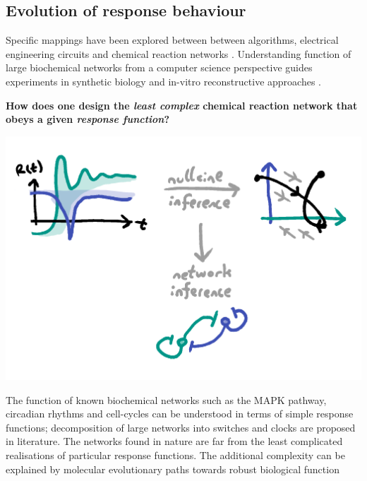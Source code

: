 \documentclass[a0,portrait]{a0poster}
\begin{document}
\color{DarkRed}\begin{center}
\section*{\huge Evolution of response behaviour}
\end{center}\color{Black}
\huge
Specific mappings have been explored between between algorithms, electrical
engineering circuits and chemical reaction networks \cite{Dalchau2014ComputationalNetworks}. Understanding function
of large biochemical networks from a computer science perspective guides experiments
in synthetic biology and in-vitro reconstructive approaches \cite{Loose2011MinMinE}.
\medbreak
\begin{tcolorbox}[boxrule=2pt,arc=3.4pt,boxsep=2mm]
\begin{center}\color{DarkRed}
\textbf{How does one design the \textit{least complex} chemical
reaction network that obeys a given \textit{response function}?}
\end{center}
\end{tcolorbox}
\begin{center}
\includegraphics[width=1.0\linewidth]{inference}
\end{center}\noindent
The function of known biochemical networks such as the MAPK pathway,
circadian rhythms and cell-cycles can be understood in terms of simple
response functions; decomposition of large networks into switches and
clocks are proposed in literature.
\medbreak\medbreak\noindent
The networks found in nature are far from the least complicated realisations
of particular response functions. The additional complexity can be
explained by molecular evolutionary paths towards robust biological function
\end{document}
